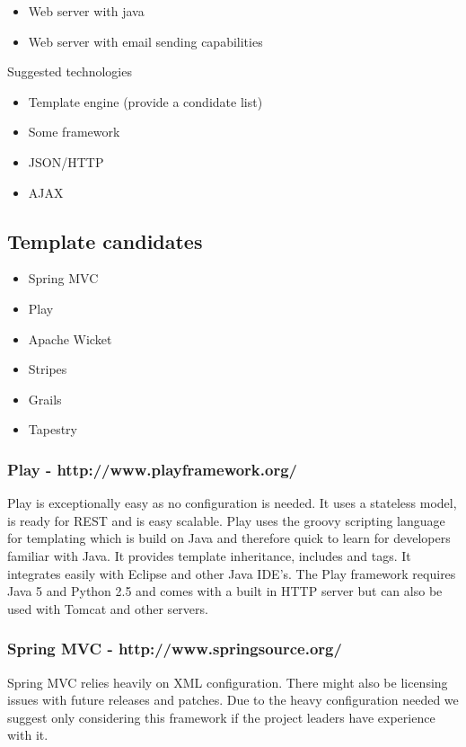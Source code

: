 \documentclass{acm_proc_article-sp}
\begin{document}
\begin{itemize}
  \item Web server with java
  \item Web server with email sending capabilities
\end{itemize}
Suggested technologies
\begin{itemize}
  \item Template engine (provide a condidate list)
  \item Some framework
  \item JSON/HTTP
  \item AJAX
\end{itemize}
 
\subsection{Template candidates}
\begin{itemize}
 \item Spring MVC
 \item Play
 \item Apache Wicket
 \item Stripes
 \item Grails
 \item Tapestry
\end{itemize}

\subsubsection*{Play - http://www.playframework.org/}

Play is exceptionally easy as no configuration is needed. It uses a stateless model, is ready for REST and is easy scalable. Play uses the groovy scripting language for templating which is build on Java and therefore quick to learn for developers familiar with Java. It provides template inheritance, includes and tags. It integrates easily with Eclipse and other Java IDE's. The Play framework requires Java 5 and Python 2.5 and comes with a built in HTTP server but can also be used with Tomcat and other servers.

\subsubsection*{Spring MVC - http://www.springsource.org/}

Spring MVC relies heavily on XML configuration. There might also be licensing issues with future releases and patches. Due to the heavy configuration needed we suggest only considering this framework if the project leaders have experience with it.
\end{document}
